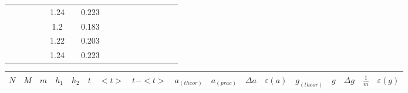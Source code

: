 \documentclass[a4paper,12pt]{article}
\begin{document}
\begin{landscape}
\begin{table}[]
\begin{tabular}{|c|c|c|c|c|c|c|c|c|c|c|c|c|c|c|c|c|}
                     &                           &                         &                         &                        & 1.24 &                         & 0.223   &                          &                          &                           &                           &                        &                           &                           &                            &                           \\ \cline{6-6} \cline{8-8}
                     &                           &                         &                         &                        & 1.2  &                         & 0.183   &                          &                          &                           &                           &                        &                           &                           &                            &                           \\ \cline{6-6} \cline{8-8}
                     &                           &                         &                         &                        & 1.22 &                         & 0.203   &                          &                          &                           &                           &                        &                           &                           &                            &                           \\ \cline{6-6} \cline{8-8}
                     &                           &                         &                         &                        & 1.24 &                         & 0.223   &                          &                          &                           &                           &                        &                           &                           &                            &                           \\ \hline
\end{tabular}
\end{table}
\begin{table}[]
\begin{tabular}{|c|c|c|c|c|c|c|c|c|c|c|c|c|c|c|c|c|}
\hline
$N$                  & $M$                       & $m$                     & $h_1$                   & $h_2$                  & $t$  & $<t>$                    & $t-<t>$ & $a_{(theor)}$            & $a_{(prac)}$             & $\Delta a$                & $\varepsilon(a)$          & $g_{(theor)}$          & $g$                       & $\Delta g$                             & $\frac 1m$                & $\varepsilon(g)$          \\ \hline

\end{tabular}
\end{table}
\end{landscape}
\end{document}
